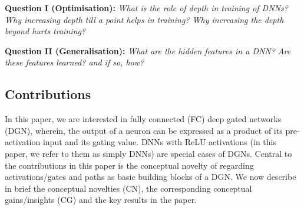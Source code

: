 \documentclass{article}
\begin{document}
\textbf{Question I (Optimisation):} \emph{What is the role of depth in training of DNNs? Why increasing depth till a point helps in training? Why increasing the depth beyond hurts training?}\\
\begin{comment}We call the above  questions are the depth phenomena. \cite{dudnn} show that, when it comes to training, residual networks are better than simple FC-DNNs. However, the depth phenomena in the case of simple FC-DNNs is still unresolved.
\end{comment}
\textbf{Question II (Generalisation):} \emph{What are the hidden features in a DNN? Are these features learned? and if so, how?}
\begin{comment}The general consensus is that, the DNNs learn hidden representations progressively in each of the intermediate layers, and the final layer learns a linear model using features obtained in the penultimate layer.  This view, while conceptually simple, however, does not provide us any analytical insight regarding the above question.  A more analytically appealing candidate for the hidden representation (used in some of the recent works \cite{}) is the \emph{neural tangent random feature} (NTRF) which is the NTF evaluated at randomised initialisation of an infinitely wide DNN. \cite{} provides generalisation bounds in terms of the Rademacher complexity of the class of functions defined by the NTRF and also in terms of an associated neural tangent kernel (NTK). \cite{} uses NTK to set a significant new benchmark for pure-kernel based learning.  An issue with the NTRF/NTK approach is that the features do not change over the training of the DNN, thus implying no feature learning is happening, and yet experimental evidence (in \cite{} as well as \Cref{sec:generalisation-exp}) shows that DNNs perform significantly better than pure-kernel learning with NTK.
\end{comment}
\subsection{Contributions}
In this paper, we are interested in fully connected (FC) deep gated networks (DGN), wherein, the output of a neuron can be expressed as a product of its pre-activation input and its gating value. DNNs with ReLU activations (in this paper, we refer to them as simply DNNs) are special cases of DGNs.
Central to the contributions in this paper is the conceptual novelty of regarding activations/gates and paths as basic building blocks of a DGN. We now describe in brief the conceptual novelties (CN), the corresponding conceptual gains/insights (CG) and the key results in the paper.
\end{document}
